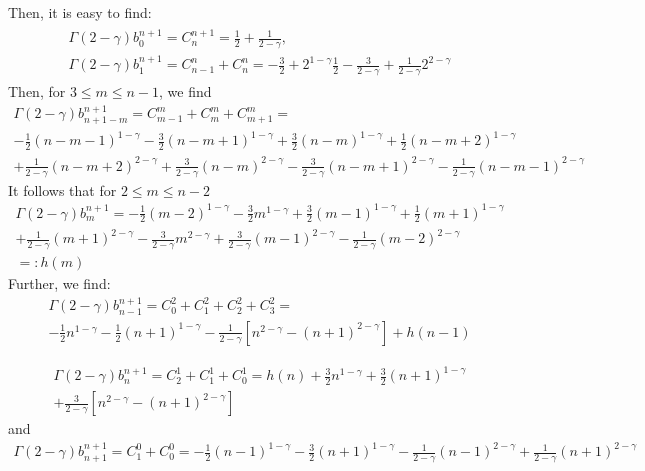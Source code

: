 \documentclass[11pt]{article}
\begin{document}
Then, it is easy to find:
\begin{gather}
\begin{array}{c}
\Gamma(2-\gamma)b_{0}^{n+1}=C_n^{n+1}=\frac{1}{2}+\frac{1}{2-\gamma},\\
\Gamma(2-\gamma)b_1^{n+1}=C_{n-1}^n+C_n^n=-\frac{3}{2}+2^{1-\gamma}\frac{1}{2}
-\frac{3}{2-\gamma}+\frac{1}{2-\gamma}2^{2-\gamma}
 \end{array}
\end{gather}
Then, for $3\le m\le n-1$, we find
\begin{multline*}
\Gamma(2-\gamma)b_{n+1-m}^{n+1}=C_{m-1}^m+C_m^m+C_{m+1}^m
=\\
-\frac{1}{2}(n-m-1)^{1-\gamma}-\frac{3}{2}(n-m+1)^{1-\gamma}+\frac{3}{2}(n-m)^{1-\gamma}+\frac{1}{2}(n-m+2)^{1-\gamma}\\
+\frac{1}{2-\gamma}(n-m+2)^{2-\gamma}
+\frac{3}{2-\gamma}(n-m)^{2-\gamma}
-\frac{3}{2-\gamma}(n-m+1)^{2-\gamma}
-\frac{1}{2-\gamma}(n-m-1)^{2-\gamma}
\end{multline*}
It follows that for $2\le m\le n-2$
\begin{multline}
\Gamma(2-\gamma)b_{m}^{n+1}=
-\frac{1}{2}(m-2)^{1-\gamma}-\frac{3}{2}m^{1-\gamma}+\frac{3}{2}(m-1)^{1-\gamma}+\frac{1}{2}(m+1)^{1-\gamma}\\
+\frac{1}{2-\gamma}(m+1)^{2-\gamma}
-\frac{3}{2-\gamma}m^{2-\gamma}
+\frac{3}{2-\gamma}(m-1)^{2-\gamma}
-\frac{1}{2-\gamma}(m-2)^{2-\gamma}\\
=:h(m)
\end{multline}
Further, we find:
\begin{multline}
\Gamma(2-\gamma)b_{n-1}^{n+1}=C_0^2+C_1^2+C_2^2+C_3^2
=\\
-\frac{1}{2}n^{1-\gamma}-\frac{1}{2}(n+1)^{1-\gamma}
-\frac{1}{2-\gamma}[n^{2-\gamma}-(n+1)^{2-\gamma}]
+h(n-1)
\end{multline}

\begin{multline}
\Gamma(2-\gamma)b_n^{n+1}=C_2^1+C_1^1+C_0^1
=h(n)+\frac{3}{2}n^{1-\gamma}+\frac{3}{2}(n+1)^{1-\gamma}\\
+\frac{3}{2-\gamma}[n^{2-\gamma}-(n+1)^{2-\gamma}]
\end{multline}
and
\begin{multline}
\Gamma(2-\gamma)b_{n+1}^{n+1}=C_1^0+C_0^0
=-\frac{1}{2}(n-1)^{1-\gamma}-\frac{3}{2}(n+1)^{1-\gamma}
-\frac{1}{2-\gamma}(n-1)^{2-\gamma}+\frac{1}{2-\gamma}(n+1)^{2-\gamma}
\end{multline}
\end{document}
